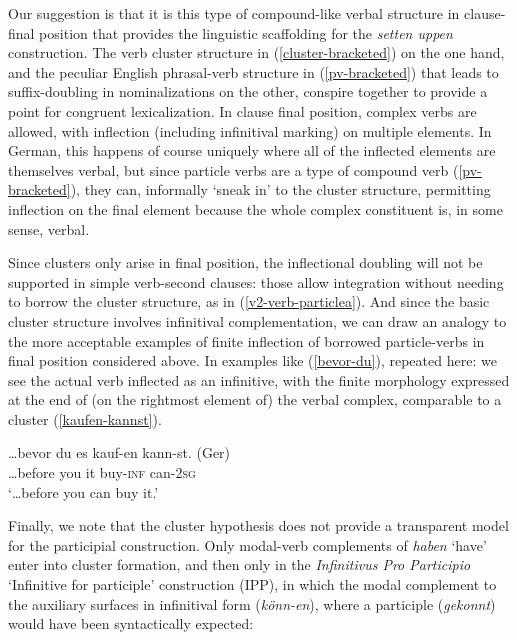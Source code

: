 \documentclass[output=paper]{langscibook}
\begin{document}
Our suggestion is that it is this type of compound-like verbal structure in clause-final position that provides the linguistic scaffolding for the \textit{setten uppen} construction. The verb cluster structure in (\ref{cluster-bracketed}) on the one hand, and the peculiar English phrasal-verb structure in (\ref{pv-bracketed}) that leads to suffix-doubling in nominalizations on the other, conspire together to provide a point for congruent lexicalization. In clause final position, complex verbs are allowed, with inflection (including infinitival marking) on multiple elements. In German, this happens of course uniquely where all of the inflected elements are themselves verbal, but since particle verbs are a type of compound verb (\ref{pv-bracketed}), they can, informally `sneak in' to the cluster structure, permitting inflection on the final element because the whole complex constituent is, in some sense, verbal. 

Since clusters only arise in final position, the inflectional doubling will not be supported in simple verb-second clauses: those allow integration without needing to borrow the cluster structure, as in (\ref{v2-verb-particlea}). And since the basic cluster structure involves infinitival complementation, we can draw an analogy to the more acceptable examples of finite inflection of borrowed particle-verbs in final position considered above. In examples like (\ref{bevor-du}), repeated here: we see the actual verb inflected as an infinitive, with the finite morphology expressed at the end of (on the rightmost element of) the verbal complex, comparable to a cluster (\ref{kaufen-kannst}).

\ea
{} 
\z\z 
\ea\gll \label{kaufen-kannst}\ldots bevor du es kauf-en kann-st. (Ger)\\
\ldots before you it buy-\textsc{inf} can-\textsc{2sg}\\
\glt `\ldots before you can buy it.'
\z 

Finally, we note that the cluster hypothesis does not provide a transparent model for the participial construction. Only modal-verb complements of \textit{haben} `have' enter into cluster formation, and then only in the \textit{Infinitivus Pro Participio} ‘Infinitive for participle’ construction (IPP), in which the modal complement to the auxiliary surfaces in infinitival form (\textit{k\"onn-en}), where a participle (\textit{gekonnt}) would have been syntactically expected:
\end{document}
